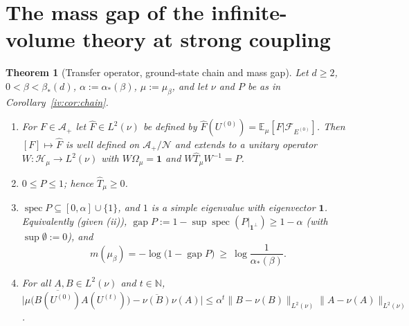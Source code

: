 \documentclass[11pt,a4paper]{article}
\newtheorem{theorem}{Theorem}[section]
\theoremstyle{definition}
\theoremstyle{remark}
\DeclareMathOperator{\spec}{spec}
\DeclareMathOperator{\gap}{gap}
\newcommand{\N}{\mathbb{N}}
\newcommand{\E}{\mathbb{E}}
\newcommand{\cH}{\mathcal{H}}
\newcommand{\cA}{\mathcal{A}}
\newcommand{\cF}{\mathcal{F}}
\newcommand{\cN}{\mathcal{N}}
\newcommand{\hT}{\hat{T}}
\newcommand{\norm}[1]{\lVert #1\rVert}
\newcommand{\aS}{\alpha_*}
\newcommand{\bS}{\beta_*}
\begin{document}
\section{The mass gap of the infinite-volume theory at strong coupling}\label{iv:sec:transfer}

\begin{theorem}[Transfer operator, ground-state chain and mass gap]\label{iv:thm:gap}
Let $d\ge2$, $0<\beta<\bS(d)$, $\alpha:=\aS(\beta)$, $\mu:=\mu_\beta$, and let $\nu$ and $P$ be as in Corollary~\ref{iv:cor:chain}.
\begin{enumerate}[label=(\roman*)]
\item For $F\in\cA_+$ let $\hat F\in L^2(\nu)$ be defined by $\hat F(U^{(0)})=\E_\mu[F|\cF_{E^{(0)}}]$. Then $[F]\mapsto\hat F$ is well
defined on $\cA_+/\cN$ and extends to a unitary operator $W:\cH_\mu\to L^2(\nu)$ with $W\Omega_\mu=\mathbf 1$ and
$W\hT_\mu W^{-1}=P$.
\item $0\le P\le1$; hence $\hT_\mu\ge0$.
\item $\spec P\subseteq[0,\alpha]\cup\{1\}$, and $1$ is a simple eigenvalue with eigenvector $\mathbf 1$. Equivalently (given (ii)),
$\gap P:=1-\sup\spec(P|_{\mathbf 1^\perp})\ge1-\alpha$ (with $\sup\emptyset:=0$), and
\[
m(\mu_\beta)=-\log\bigl(1-\gap P\bigr)\ \ge\ \log\frac1{\aS(\beta)} .
\]
\item For all $A,B\in L^2(\nu)$ and $t\in\N$,
$\bigl|\mu\bigl(\overline{B(U^{(0)})}A(U^{(t)})\bigr)-\overline{\nu(B)}\nu(A)\bigr|\le\alpha^t\norm{B-\nu(B)}_{L^2(\nu)}\norm{A-\nu(A)}_{L^2(\nu)}$.
\end{enumerate}
\end{theorem}
\end{document}
